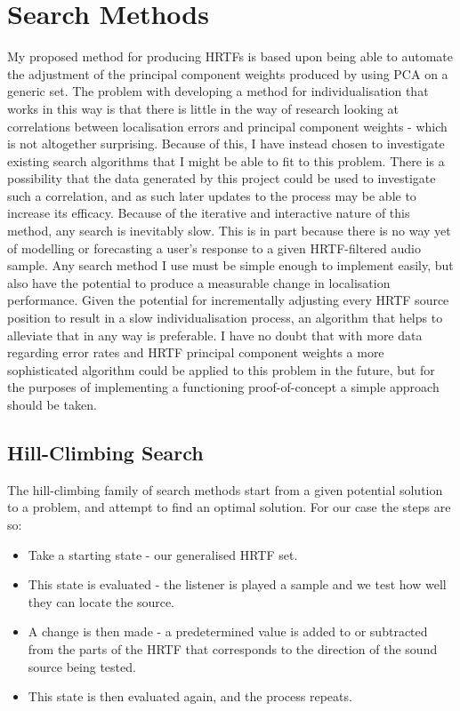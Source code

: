 \section{Search Methods}

My proposed method for producing HRTFs is based upon being able to automate the adjustment of the principal component weights produced by using PCA on a generic set. The problem with developing a method for individualisation that works in this way is that there is little in the way of research looking at correlations between localisation errors and principal component weights - which is not altogether surprising. Because of this, I have instead chosen to investigate existing search algorithms that I might be able to fit to this problem. There is a possibility that the data generated by this project could be used to investigate such a correlation, and as such later updates to the process may be able to increase its efficacy. Because of the iterative and interactive nature of this method, any search is inevitably slow. This is in part because there is no way yet of modelling or forecasting a user's response to a given HRTF-filtered audio sample. Any search method I use must be simple enough to implement easily, but also have the potential to produce a measurable change in localisation performance. Given the potential for incrementally adjusting every HRTF source position to result in a slow individualisation process, an algorithm that helps to alleviate that in any way is preferable. I have no doubt that with more data regarding error rates and HRTF principal component weights a more sophisticated algorithm could be applied to this problem in the future, but for the purposes of implementing a functioning proof-of-concept a simple approach should be taken.

\subsection{Hill-Climbing Search}
The hill-climbing family of search methods \citep{norvig1995} start from a given potential solution to a problem, and attempt to find an optimal solution. For our case the steps are so: 
\begin{itemize}
\item Take a starting state - our generalised HRTF set.
\item This state is evaluated - the listener is played a sample and we test how well they can locate the source. 
\item A change is then made - a predetermined value is added to or subtracted from the parts of the HRTF that corresponds to the direction of the sound source being tested.
\item This state is then evaluated again, and the process repeats. 
\end{itemize} 

